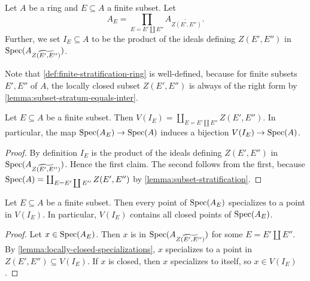 \begin{definition}
    Let $A$ be a ring and $E \subseteq A$ a finite subset. Let
    \[
    A_{E} = \prod_{E = E' \coprod E''} A_{\widetilde{Z(E', E'')}}
    .\]
    Further, we set $I_E \subseteq A$ to be the product of the ideals
    defining $Z(E', E'')$ in $\mathrm{Spec}(A_{\widetilde{Z(E', E'')}})$.
    \label{def:finite-stratification-ring}
    \leanok
\end{definition}

Note that \ref{def:finite-stratification-ring} is well-defined, because for finite
subsets $E', E''$ of $A$, the locally closed subset $Z(E', E'')$ is always
of the right form by \ref{lemma:subset-stratum-equals-inter}.

\begin{lemma}
    Let $E \subseteq A$ be a finite subset. Then
    $V(I_E) = \coprod_{E = E' \coprod E''} Z(E', E'')$. In particular,
    the map $\mathrm{Spec}(A_E) \to \mathrm{Spec}(A)$ induces a bijection $V(I_E) \to \mathrm{Spec}(A)$.
    \label{lemma:finite-stratification-ideal-bijection}
    \leanok
\end{lemma}

\begin{proof}
    \leanok
    By definition $I_E$ is the product of the ideals defining $Z(E', E'')$ in
    $\mathrm{Spec}(A_{\widetilde{Z(E', E'')}})$. Hence the first claim. The second
    follows from the first, because $\mathrm{Spec}(A) = \coprod_{E = E' \coprod E''} Z(E', E'')$ by
    \ref{lemma:subset-stratification}.
\end{proof}

\begin{lemma}
    Let $E \subseteq A$ be a finite subset. Then every point of $\mathrm{Spec}(A_E)$ specializes
    to a point in $V(I_E)$. In particular, $V(I_E)$ contains all closed points of $\mathrm{Spec}(A_E)$.%
    \label{lemma:finite-stratification-closed-points}
    \leanok
\end{lemma}

\begin{proof}
    \leanok
    Let $x \in \mathrm{Spec}(A_E)$. Then $x$ is in $\mathrm{Spec}(A_{\widetilde{Z(E', E'')}})$ for some
    $E = E' \coprod E''$. By
    \ref{lemma:locally-closed-specializations}, $x$ specializes to a point
    in $Z(E', E'') \subseteq V(I_E)$.
    If $x$ is closed, then $x$ specializes to itself, so $x \in V(I_E)$.
\end{proof}

